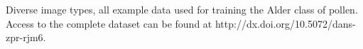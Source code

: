 \label{fig:trainingImages}
Diverse image types, all example data used for training the Alder class of pollen. Access to the complete dataset can be found at http://dx.doi.org/10.5072/dans-zpr-rjm6.
  
  